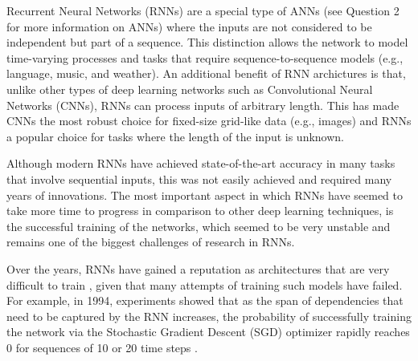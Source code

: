 





Recurrent Neural Networks (RNNs) are a special type of ANNs
(see Question 2 for more information on ANNs) where the
inputs are not considered to be independent but part of a
sequence. This distinction allows the network to model
time-varying processes and tasks that require
sequence-to-sequence models (e.g., language, music, and
weather). An additional benefit of RNN archictures is that,
unlike other types of deep learning networks such as
Convolutional Neural Networks (CNNs), RNNs can process
inputs of arbitrary length. This has made CNNs the most
robust choice for fixed-size grid-like data (e.g., images)
and RNNs a popular choice for tasks where the length of the
input is unknown.

Although modern RNNs have achieved state-of-the-art accuracy
in many tasks that involve sequential inputs, this was not
easily achieved and required many years of innovations. The
most important aspect in which RNNs have seemed to take more
time to progress in comparison to other deep learning
techniques, is the successful training of the networks,
which seemed to be very unstable and remains one of the
biggest challenges of research in RNNs.


Over the years, RNNs have gained a reputation as
architectures that are very difficult to train
\cite{pascanu2013difficulty}, given that many attempts of
training such models have failed. For example, in 1994,
experiments showed that as the span of dependencies that
need to be captured by the RNN increases, the probability of
successfully training the network via the Stochastic
Gradient Descent (SGD) optimizer rapidly reaches 0 for
sequences of 10 or 20 time steps \cite{bengio1994learning}.

